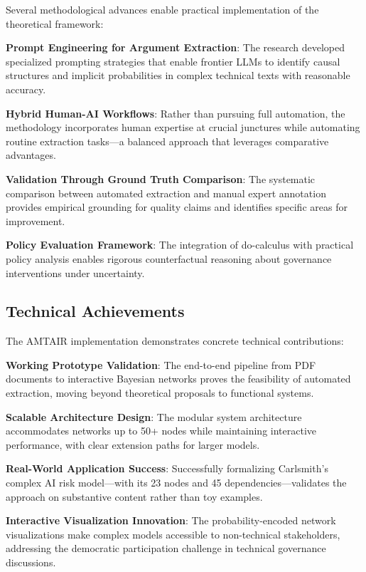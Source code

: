 \documentclass[
  11pt,
  letterpaper,
]{book}
\begin{document}
Several methodological advances enable practical implementation of the
theoretical framework:

\textbf{Prompt Engineering for Argument Extraction}: The research
developed specialized prompting strategies that enable frontier LLMs to
identify causal structures and implicit probabilities in complex
technical texts with reasonable accuracy.

\textbf{Hybrid Human-AI Workflows}: Rather than pursuing full
automation, the methodology incorporates human expertise at crucial
junctures while automating routine extraction tasks---a balanced
approach that leverages comparative advantages.

\textbf{Validation Through Ground Truth Comparison}: The systematic
comparison between automated extraction and manual expert annotation
provides empirical grounding for quality claims and identifies specific
areas for improvement.

\textbf{Policy Evaluation Framework}: The integration of do-calculus
with practical policy analysis enables rigorous counterfactual reasoning
about governance interventions under uncertainty.

\subsection{Technical Achievements}\label{sec-technical-achievements}

The AMTAIR implementation demonstrates concrete technical contributions:

\textbf{Working Prototype Validation}: The end-to-end pipeline from PDF
documents to interactive Bayesian networks proves the feasibility of
automated extraction, moving beyond theoretical proposals to functional
systems.

\textbf{Scalable Architecture Design}: The modular system architecture
accommodates networks up to 50+ nodes while maintaining interactive
performance, with clear extension paths for larger models.

\textbf{Real-World Application Success}: Successfully formalizing
Carlsmith's complex AI risk model---with its 23 nodes and 45
dependencies---validates the approach on substantive content rather than
toy examples.

\textbf{Interactive Visualization Innovation}: The probability-encoded
network visualizations make complex models accessible to non-technical
stakeholders, addressing the democratic participation challenge in
technical governance discussions.
\end{document}
